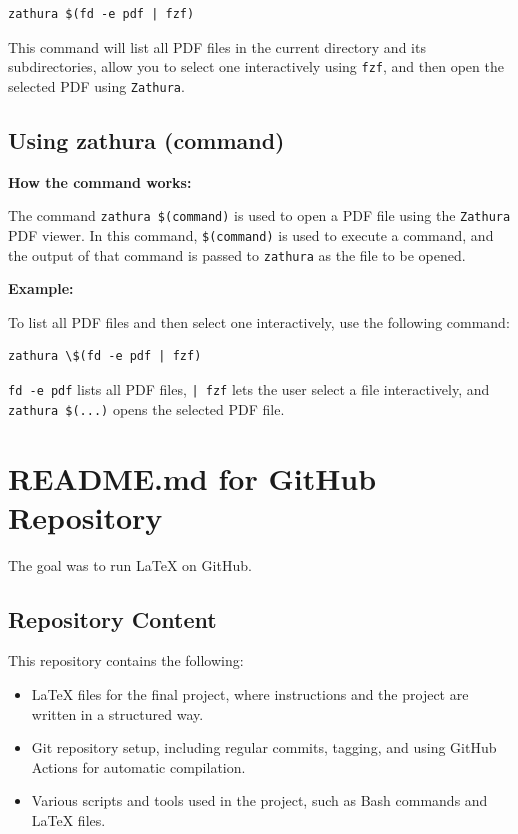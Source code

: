 \documentclass{article}
\begin{document}
\begin{verbatim}
zathura $(fd -e pdf | fzf)
\end{verbatim}
This command will list all PDF files in the current directory and its subdirectories, allow you to select one interactively using \texttt{fzf}, and then open the selected PDF using \texttt{Zathura}.






\subsection*{Using zathura (command)}

\textbf{How the command works:}

The command \texttt{zathura \$(command)} is used to open a PDF file using the \texttt{Zathura} PDF viewer. In this command, \texttt{\$(command)} is used to execute a command, and the output of that command is passed to \texttt{zathura} as the file to be opened.

\textbf{Example:}

To list all PDF files and then select one interactively, use the following command:

\begin{verbatim}
zathura \$(fd -e pdf | fzf)
\end{verbatim}

\texttt{fd -e pdf} lists all PDF files, \texttt{| fzf} lets the user select a file interactively, and \texttt{zathura \$(...)} opens the selected PDF file.








\section*{README.md for GitHub Repository}

The goal was to run LaTeX on GitHub.

\subsection*{Repository Content}

This repository contains the following:

\begin{itemize}
    \item LaTeX files for the final project, where instructions and the project are written in a structured way.
    \item Git repository setup, including regular commits, tagging, and using GitHub Actions for automatic compilation.
    \item Various scripts and tools used in the project, such as Bash commands and LaTeX files.
\end{itemize}
\end{document}
